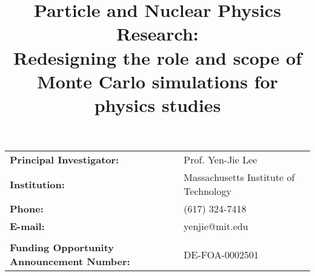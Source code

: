 \begin{titlepage}
\vspace{2.2 cm}
\title{\textbf{Particle and Nuclear Physics Research: \\
Redesigning the role and scope of Monte Carlo simulations for physics studies\\
}}

\vspace{.2 cm} 

\begin{center}
\begin{tabular}{ll}
 
\textbf{Principal Investigator:} & Prof. Yen-Jie Lee \\
\textbf{Institution:}                    & Massachusetts Institute of Technology \\
\textbf{Phone:} & 			(617) 324-7418 \\
\textbf{E-mail:} & 			yenjie@mit.edu \\
& \\
\textbf{Funding Opportunity Announcement Number:} & 	DE-FOA-0002501 \\

\end{tabular}
\end{center}



\end{titlepage}






